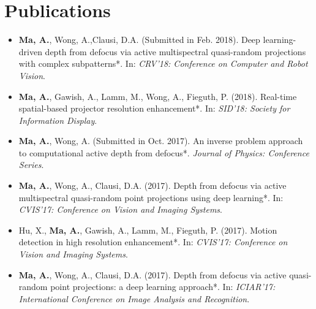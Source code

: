 \section*{Publications}
    \vspace{\postsubhead}
    \begin{adjustwidth}{\indentleft}{\indentright}
        \begin{itemize}
            
            \item \textbf{Ma, A.}, Wong, A.,Clausi, D.A. (Submitted in Feb. 2018). Deep learning-driven depth from defocus via active multispectral quasi-random projections with complex subpatterns*. In: \emph{CRV'18: Conference on Computer and Robot Vision}.
            
            \item \textbf{Ma, A.}, Gawish, A., Lamm, M., Wong, A., Fieguth, P. (2018). Real-time spatial-based projector resolution enhancement*. In: \emph{SID'18: Society for Information Display}.
            
            \item \textbf{Ma, A.}, Wong, A. (Submitted in Oct. 2017). An inverse problem approach to computational active depth from defocus*. \emph{Journal of Physics: Conference Series}.
            
            \item \textbf{Ma, A.}, Wong, A., Clausi, D.A. (2017). Depth from defocus via active multispectral quasi-random point projections using deep learning*. In: \emph{CVIS'17: Conference on Vision and Imaging Systems}.
           
            \item Hu, X., \textbf{Ma, A.}, Gawish, A., Lamm, M., Fieguth, P. (2017). Motion detection in high resolution enhancement*. In: \emph{CVIS'17: Conference on Vision and Imaging Systems}.
            
            \item \textbf{Ma, A.}, Wong, A., Clausi, D.A. (2017). Depth from defocus via active quasi-random point projections: a deep learning approach*. In: \emph{ICIAR'17: International Conference on Image Analysis and Recognition}.
            

\end{itemize}
\end{adjustwidth}
